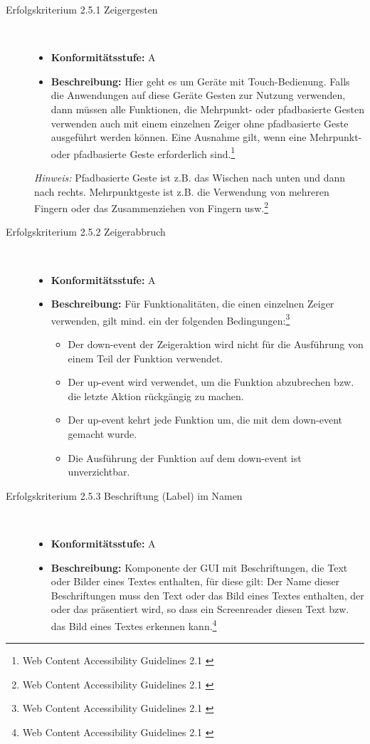 \begin{description}
\begin{description}
		\item [Erfolgskriterium 2.5.1 Zeigergesten]\hfill \\
		\begin{itemize}
			\item \textbf{Konformitätsstufe:} A
			\item \textbf{Beschreibung:} Hier geht es um Geräte mit Touch-Bedienung. Falls die Anwendungen auf diese Geräte Gesten zur Nutzung verwenden, dann müssen alle Funktionen, 
			die Mehrpunkt- oder pfadbasierte Gesten verwenden auch mit einem einzelnen Zeiger ohne pfadbasierte Geste ausgeführt werden können. Eine Ausnahme gilt, wenn eine 
			Mehrpunkt- oder pfadbasierte Geste erforderlich sind.\footnote{Web Content Accessibility Guidelines 2.1 \cite{WCAG2.1}}
		\end{itemize}
		
		\textit{Hinweis:} Pfadbasierte Geste ist z.B. das Wischen nach unten und dann nach rechts. Mehrpunktgeste ist z.B. die Verwendung von mehreren Fingern oder das Zusammenziehen von 
		Fingern usw.\footnote{Web Content Accessibility Guidelines 2.1 \cite{WCAG2.1}}
		
		\item [Erfolgskriterium 2.5.2 Zeigerabbruch]\hfill \\
		\begin{itemize}
			\item \textbf{Konformitätsstufe:} A
			\item \textbf{Beschreibung:} Für Funktionalitäten, die einen einzelnen Zeiger verwenden, gilt mind. ein der folgenden 
			Bedingungen:\footnote{Web Content Accessibility Guidelines 2.1 \cite{WCAG2.1}}
			\begin{itemize}
				\item Der down-event der Zeigeraktion wird nicht für die Ausführung von einem Teil der Funktion verwendet.
				\item Der up-event wird verwendet, um die Funktion abzubrechen bzw. die letzte Aktion rückgängig zu machen.
				\item Der up-event kehrt jede Funktion um, die mit dem down-event gemacht wurde.
				\item Die Ausführung der Funktion auf dem down-event ist unverzichtbar.
			\end{itemize}
		\end{itemize}
		
		\item [Erfolgskriterium 2.5.3 Beschriftung (Label) im Namen]\hfill \\
		\begin{itemize}
			\item \textbf{Konformitätsstufe:} A
			\item \textbf{Beschreibung:} Komponente der \ac{GUI} mit Beschriftungen, die Text oder Bilder eines Textes enthalten, für diese gilt: Der Name
			dieser Beschriftungen muss den Text oder das Bild eines Textes enthalten, der oder das präsentiert wird, so dass ein Screenreader diesen Text bzw. das Bild eines Textes 
			erkennen kann.\footnote{Web Content Accessibility Guidelines 2.1 \cite{WCAG2.1}}
		\end{itemize}
		

\end{description}
\end{description}
